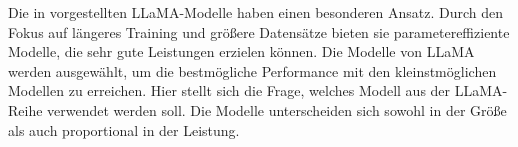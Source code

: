 Die in \citet{llama} vorgestellten LLaMA-Modelle haben einen besonderen Ansatz.
Durch den Fokus auf längeres Training und größere Datensätze bieten sie parametereffiziente Modelle, die sehr gute Leistungen erzielen können.
Die Modelle von LLaMA werden ausgewählt, um die bestmögliche Performance mit den kleinstmöglichen Modellen zu erreichen.
Hier stellt sich die Frage, welches Modell aus der LLaMA-Reihe verwendet werden soll.
Die Modelle unterscheiden sich sowohl in der Größe als auch proportional in der Leistung.\\

\begin{table}[t!]
    \centering
    \setlength{\tabcolsep}{5pt}
\end{table}
